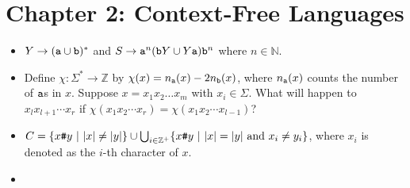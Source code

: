 \section{Chapter 2: Context-Free Languages}

\begin{itemize}
	
	
	\item[\hard 2.19]
	\begin{comment}
	Let CFG $G$ be the following grammar.
	\[
		\begin{array}{rcl}
			S & \to & \texttt{a}S\texttt{b} \ | \ \texttt{b}Y \ | \ Y\texttt{a} \\
			Y & \to & \texttt{b}Y \ | \ \texttt{a}Y \ | \ \epsilon
		\end{array}
	\]
	Give a simple description of $L(G)$ in English. Use that description to give a CFG for $\overline{L(G)}$, the complement of $L(G)$.
	
	\hint
	\end{comment}
	$Y \to (\tt{a} \cup \tt{b})^*$ and $S \to \tt{a}^n (\tt{b} Y \cup Y \tt{a}) \tt{b}^n$ where $n \in \mathbb{N}$.
	
	
	\item[\hard 2.21] 
	\begin{comment}
	Let $\Sigma = \{ \tt{a}, \tt{b} \}$. Give a CFG generating the language of strings with twice as many $\tt{a}$'s as $\tt{b}$'s. Prove that your grammar is correct.
	
	\hint
	\end{comment}
	Define $\chi : \Sigma^* \to \mathbb{Z}$ by $\chi(x) = n_{\tt{a}}(x) - 2 n_{\tt{b}}(x)$, where $n_{\tt{a}}(x)$ counts the number of $\tt{a}$s in $x$. Suppose $x = x_1 x_2 \dots x_m$ with $x_i \in \Sigma$. What will happen to $x_l x_{l+1} \cdots x_r$ if $\chi(x_1 x_2 \cdots x_r) = \chi(x_1 x_2 \cdots x_{l-1})$?
	
	
	\item[\hard 2.22] 
	\begin{comment}
	Let $C = \{ x \tt{\#} y \ | \ x,y \in \{\tt{0},\tt{1}\}^* \text{ and } x \neq y \}$. Show that $C$ is a context-free language.
	
	\hint
	\end{comment}
	$C = \{ x \tt{\#} y \ | \ |x| \neq |y| \} \cup \bigcup_{i \in \mathbb{Z}^+} \{ x \tt{\#} y \ | \ |x| = |y| \text{ and } x_i \neq y_i \}$, where $x_i$ is denoted as the $i$-th character of $x$.
	
	
	\item[\hard 2.23]
	\begin{comment}
	Let $D = \{ xy \ | \ x,y \in \{\tt{0},\tt{1}\}^* \text{ and } |x|=|y| \text{ but } x \neq y \}$. Show that $D$ is a context-free language.
	

\end{comment}
\end{itemize}
